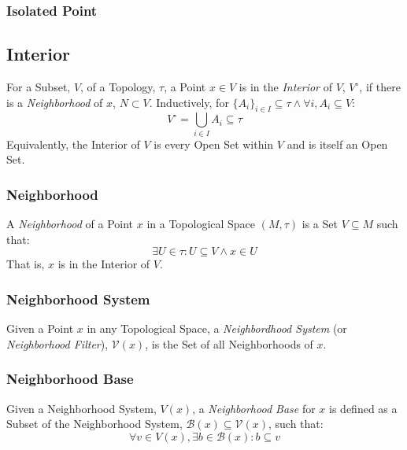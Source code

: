 \subsubsection{Isolated Point}\label{sec:isolated_point}



\subsection{Interior}\label{sec:interior}

For a Subset, $V$, of a Topology, $\tau$, a Point $x \in V$ is in the
\emph{Interior} of $V$, $V^{\circ}$, if there is a \emph{Neighborhood}
of $x$, $N \subset V$. Inductively, for $\{A_i\}_{i \in I} \subseteq
\tau \wedge \forall i, A_i \subseteq V$:
\[
    V^{\circ} = \bigcup_{i \in I} A_i \subseteq \tau
\]
Equivalently, the Interior of $V$ is every Open Set within $V$ and is
itself an Open Set.



\subsubsection{Neighborhood}\label{sec:neighborhood}

A \emph{Neighborhood} of a Point $x$ in a Topological Space $(M,\tau)$
is a Set $V \subseteq M$ such that:
\[
    \exists U \in \tau : U \subseteq V \wedge x \in U
\]
That is, $x$ is in the Interior of $V$.



\subsubsection{Neighborhood System}\label{sec:neighborhood_system}

Given a Point $x$ in any Topological Space, a \emph{Neighbordhood
  System} (or \emph{Neighborhood Filter}), $\mathcal{V}(x)$, is the
Set of all Neighborhoods of $x$.



\subsubsection{Neighborhood Base}\label{sec:neighborhood_base}

Given a Neighborhood System, $V(x)$, a \emph{Neighborhood Base} for
$x$ is defined as a Subset of the Neighborhood System, $\mathcal{B}(x)
\subseteq \mathcal{V}(x)$, such that:
\[
    \forall v \in V(x), \exists b \in \mathcal{B}(x) : b \subseteq v
\]



